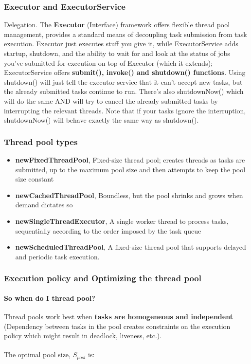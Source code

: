 \documentclass{article}
\begin{document}
\subsubsection{Executor and ExecutorService}
Delegation. The \textbf{Executor} (Interface) framework offers flexible thread pool management, provides a standard means of decoupling task submission from task execution. Executor just executes stuff you give it, while ExecutorService adds startup, shutdown, and the ability to wait for and look at the status of jobs you've submitted for execution on top of Executor (which it extends); ExecutorService offers \textbf{submit(), invoke() and shutdown() functions}. Using shutdown() will just tell the executor service that it can't accept new tasks, but the already submitted tasks continue to run. There's also shutdownNow() which will do the same AND will try to cancel the already submitted tasks by interrupting the relevant threads. Note that if your tasks ignore the interruption, shutdownNow() will behave exactly the same way as shutdown().

\subsubsection{Thread pool types}
\begin{itemize}
    \item \textbf{newFixedThreadPool}, Fixed-size thread pool; creates threads as tasks are submitted, up to the maximum pool size and then attempts to keep the pool size constant
    \item \textbf{newCachedThreadPool}, Boundless, but the pool shrinks and grows when demand dictates so
    \item \textbf{newSingleThreadExecutor}, A single worker thread to process tasks, sequentially according to the order imposed by the task queue
    \item \textbf{newScheduledThreadPool}, A fixed-size thread pool that supports delayed and periodic task execution.
\end{itemize}

\subsubsection{Execution policy and Optimizing the thread pool}
\paragraph{So when do I thread pool?} Thread pools work best when \textbf{tasks are homogeneous and independent} (Dependency between tasks in the pool creates constraints on the execution policy which might result in deadlock, liveness, etc.).\\
\\
The optimal pool size, $S_{pool}$ is:
\end{document}

